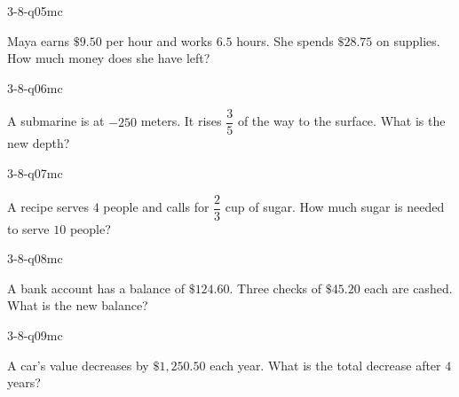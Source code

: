 \begin{practiceQuestion}{3-8-q05}{mc}
\begin{questionText}
Maya earns $\$9.50$ per hour and works $6.5$ hours. She spends $\$28.75$ on supplies. How much money does she have left?
\end{questionText}
\end{practiceQuestion}

\begin{practiceQuestion}{3-8-q06}{mc}
\begin{questionText}
A submarine is at $-250$ meters. It rises $\dfrac{3}{5}$ of the way to the surface. What is the new depth?
\end{questionText}
\end{practiceQuestion}

\begin{practiceQuestion}{3-8-q07}{mc}
\begin{questionText}
A recipe serves $4$ people and calls for $\dfrac{2}{3}$ cup of sugar. How much sugar is needed to serve $10$ people?
\end{questionText}
\end{practiceQuestion}

\begin{practiceQuestion}{3-8-q08}{mc}
\begin{questionText}
A bank account has a balance of $\$124.60$. Three checks of $\$45.20$ each are cashed. What is the new balance?
\end{questionText}
\end{practiceQuestion}

\begin{practiceQuestion}{3-8-q09}{mc}
\begin{questionText}
A car's value decreases by $\$1{,}250.50$ each year. What is the total decrease after $4$ years?
\end{questionText}
\end{practiceQuestion}

